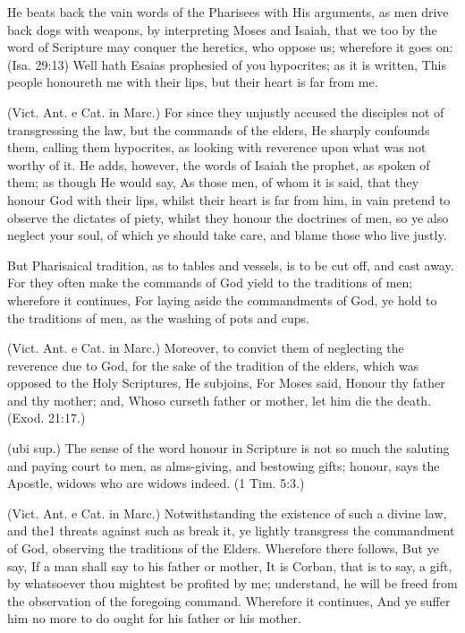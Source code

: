  He beats back the vain words of the Pharisees with His arguments, as men drive back dogs with weapons, by interpreting Moses and Isaiah, that we too by the word of Scripture may conquer the heretics, who oppose us; wherefore it goes on: (Isa. 29:13) Well hath Esaias prophesied of you hypocrites; as it is written, This people honoureth me with their lips, but their heart is far from me.

 (Vict. Ant. e Cat. in Marc.) For since they unjustly accused the disciples not of transgressing the law, but the commands of the elders, He sharply confounds them, calling them hypocrites, as looking with reverence upon what was not worthy of it. He adds, however, the words of Isaiah the prophet, as spoken of them; as though He would say, As those men, of whom it is said, that they honour God with their lips, whilst their heart is far from him, in vain pretend to observe the dictates of piety, whilst they honour the doctrines of men, so ye also neglect your soul, of which ye should take care, and blame those who live justly.

 But Pharisaical tradition, as to tables and vessels, is to be cut off, and cast away. For they often make the commands of God yield to the traditions of men; wherefore it continues, For laying aside the commandments of God, ye hold to the traditions of men, as the washing of pots and cups.

 (Vict. Ant. e Cat. in Marc.) Moreover, to convict them of neglecting the reverence due to God, for the sake of the tradition of the elders, which was opposed to the Holy Scriptures, He subjoins, For Moses said, Honour thy father and thy mother; and, Whoso curseth father or mother, let him die the death. (Exod. 21:17.)

 (ubi sup.) The sense of the word honour in Scripture is not so much the saluting and paying court to men, as alms-giving, and bestowing gifts; honour, says the Apostle, widows who are widows indeed. (1 Tim. 5:3.)

 (Vict. Ant. e Cat. in Marc.) Notwithstanding the existence of such a divine law, and the1 threats against such as break it, ye lightly transgress the commandment of God, observing the traditions of the Elders. Wherefore there follows, But ye say, If a man shall say to his father or mother, It is Corban, that is to say, a gift, by whatsoever thou mightest be profited by me; understand, he will be freed from the observation of the foregoing command. Wherefore it continues, And ye suffer him no more to do ought for his father or his mother.


